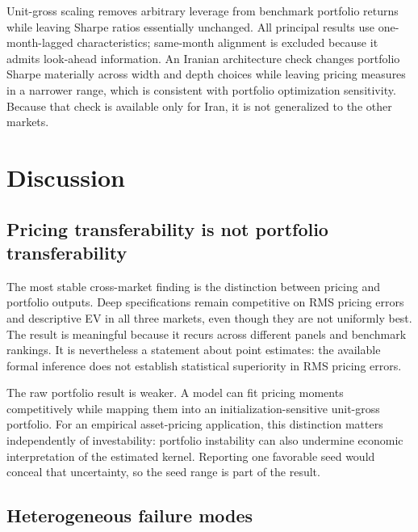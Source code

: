 \documentclass[12pt]{article}
\begin{document}
Unit-gross scaling removes arbitrary leverage from benchmark portfolio returns while leaving Sharpe ratios essentially unchanged. All principal results use one-month-lagged characteristics; same-month alignment is excluded because it admits look-ahead information. An Iranian architecture check changes portfolio Sharpe materially across width and depth choices while leaving pricing measures in a narrower range, which is consistent with portfolio optimization sensitivity. Because that check is available only for Iran, it is not generalized to the other markets.

\section{Discussion}\label{sec:discussion}

\subsection{Pricing transferability is not portfolio transferability}

The most stable cross-market finding is the distinction between pricing and portfolio outputs. Deep specifications remain competitive on RMS pricing errors and descriptive EV in all three markets, even though they are not uniformly best. The result is meaningful because it recurs across different panels and benchmark rankings. It is nevertheless a statement about point estimates: the available formal inference does not establish statistical superiority in RMS pricing errors.

The raw portfolio result is weaker. A model can fit pricing moments competitively while mapping them into an initialization-sensitive unit-gross portfolio. For an empirical asset-pricing application, this distinction matters independently of investability: portfolio instability can also undermine economic interpretation of the estimated kernel. Reporting one favorable seed would conceal that uncertainty, so the seed range is part of the result.

\subsection{Heterogeneous failure modes}
\end{document}
